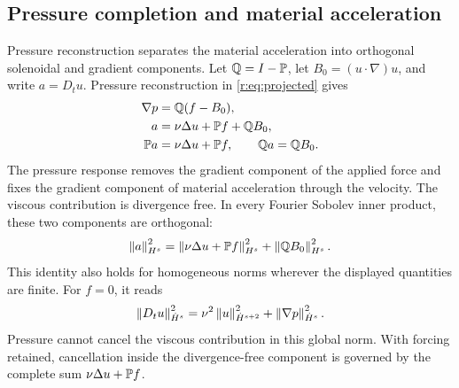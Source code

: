 \subsection{Pressure completion and material acceleration}
\label{r:sec:orthogonal-acceleration}

Pressure reconstruction separates the material acceleration into
orthogonal solenoidal and gradient components. Let
\(\mathbb Q=I-\mathbb P\), let \(B_0=(u\cdot\nabla)u\), and write
\(a=D_tu\). Pressure reconstruction in \eqref{r:eq:projected} gives
\begin{equation}
 \begin{aligned}
 \nabla p&=\mathbb Q(f-B_0),\\
 a&=\nu\Delta u+\mathbb P f+\mathbb Q B_0,\\
 \mathbb P a&=\nu\Delta u+\mathbb P f,\qquad
 \mathbb Q a=\mathbb Q B_0.
 \end{aligned}
 \label{r:eq:acceleration-projections}
\end{equation}
The pressure response removes the gradient component of the applied
force and fixes the gradient component of material acceleration through
the velocity. The viscous contribution is divergence free. In every
Fourier Sobolev inner product, these two components are orthogonal:
\begin{equation}
 \left\lVert a\right\rVert_{H^s}^2
 =\left\lVert \nu\Delta u+\mathbb P f\right\rVert_{H^s}^2
  +\left\lVert \mathbb Q B_0\right\rVert_{H^s}^2.
 \label{r:eq:acceleration-orthogonal}
\end{equation}
This identity also holds for homogeneous norms wherever the displayed
quantities are finite. For \(f=0\), it reads
\[
 \left\lVert D_tu\right\rVert_{\dot H^s}^2
 =\nu^2\left\lVert u\right\rVert_{\dot H^{s+2}}^2
  +\left\lVert \nabla p\right\rVert_{\dot H^s}^2.
\]
Pressure cannot cancel the viscous contribution in this global norm.
With forcing retained, cancellation inside the divergence-free component
is governed by the complete sum \(\nu\Delta u+\mathbb P f\).

